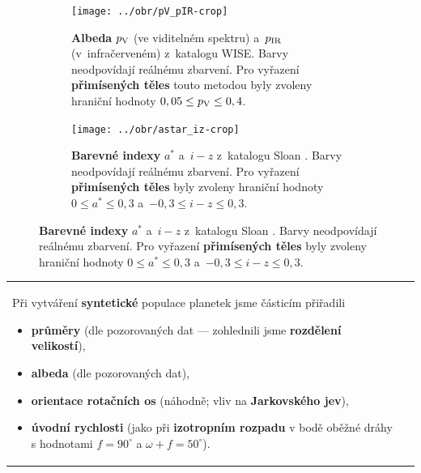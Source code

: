 \documentclass{beamer}
\newlength{\sep}
\newlength{\vyska}
\newlength{\vyskaB}
\newlength{\main}
\begin{document}
\begin{frame}
\begin{columns}[t]
\begin{column}{\main}
\begin{tcolorbox}[title=Určení členů rodiny Eunomia\phantom{Úy},height=0.25\vyskaB]
\begin{figure}[htbp]
\begin{subfigure}[b]{0.26\textwidth}
		\end{subfigure}
		\begin{subfigure}[b]{0.2\textwidth}
			\centering
			\captionsetup{width=.88\linewidth}
			\texttt{[image: ../obr/pV\_pIR-crop]}
			\caption{\textbf{Albeda} $p_{\rm V}$ (ve viditelném spektru) a~$p_{\rm IR}$ (v~infračerveném) z~katalogu WISE. Barvy neodpovídají reálnému zbarvení. Pro vyřazení \textbf{přimísených těles} touto metodou byly zvoleny hraniční hodnoty $0,05 \leq p_{\rm V} \leq 0,4$.\newline}
		\end{subfigure}
		\begin{subfigure}[b]{0.2\textwidth}
			\centering
			\captionsetup{width=.88\linewidth}
			\texttt{[image: ../obr/astar\_iz-crop]}
			\caption{\textbf{Barevné indexy} $a^*$ a~$i-z$ z~katalogu Sloan \cite{ivezic01}. Barvy neodpovídají reálnému zbarvení. Pro vyřazení \textbf{přimísených těles} byly zvoleny hraniční hodnoty $0\leq a^* \leq 0,3$ a~$-0,3\leq i-z \leq 0,3$.\newline\newline}
		\end{subfigure}
	\end{figure}

\end{tcolorbox}

\vspace{\sep}

\begin{tcolorbox}[title=Simulace orbitálního vývoje\phantom{Úy},height=0.75\vyskaB]
	\begin{tabularx}{\textwidth}{Xp{}}

	Při vytváření \textbf{syntetické} populace planetek jsme částicím přiřadili 
	\begin{itemize}
	\item \textbf{průměry} (dle pozorovaných dat --- zohlednili jsme \textbf{rozdělení velikostí}), 
	\item \textbf{albeda} (dle pozorovaných dat),
	\item \textbf{orientace rotačních os} (náhodně; vliv na \textbf{Jarkovského jev}),
	\item \textbf{úvodní rychlosti} (jako při \textbf{izotropním rozpadu} v bodě oběžné dráhy s hodnotami $f=90^\circ$ a $\omega+f=50^\circ$).
	\end{itemize}


\end{tabularx}
\end{tcolorbox}
\end{column}
\end{columns}
\end{frame}
\end{document}
